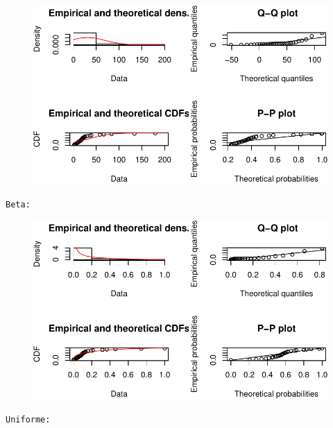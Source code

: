\documentclass[
  letterpaper,
  DIV=11,
  numbers=noendperiod]{scrartcl}
\begin{document}
\begin{figure}[H]

{\centering \includegraphics{quiz5_files/figure-pdf/unnamed-chunk-35-5.pdf}

}

\end{figure}

\begin{verbatim}
Beta: 
\end{verbatim}

\begin{figure}[H]

{\centering \includegraphics{quiz5_files/figure-pdf/unnamed-chunk-35-6.pdf}

}

\end{figure}

\begin{verbatim}
Uniforme: 
\end{verbatim}
\end{document}
